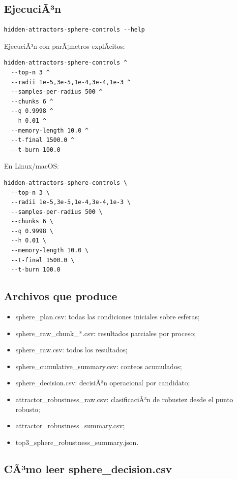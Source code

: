 \documentclass[11pt]{article}
\DeclareRobustCommand{\codepath}[1]{\begingroup\Urlmuskip=0mu plus 2mu\path{#1}\endgroup}
\def\codepath#1{#1}%
\begin{document}
\subsection{EjecuciÃ³n}

\begin{lstlisting}
hidden-attractors-sphere-controls --help
\end{lstlisting}

EjecuciÃ³n con parÃ¡metros explÃ­citos:

\begin{lstlisting}
hidden-attractors-sphere-controls ^
  --top-n 3 ^
  --radii 1e-5,3e-5,1e-4,3e-4,1e-3 ^
  --samples-per-radius 500 ^
  --chunks 6 ^
  --q 0.9998 ^
  --h 0.01 ^
  --memory-length 10.0 ^
  --t-final 1500.0 ^
  --t-burn 100.0
\end{lstlisting}

En Linux/macOS:

\begin{lstlisting}
hidden-attractors-sphere-controls \
  --top-n 3 \
  --radii 1e-5,3e-5,1e-4,3e-4,1e-3 \
  --samples-per-radius 500 \
  --chunks 6 \
  --q 0.9998 \
  --h 0.01 \
  --memory-length 10.0 \
  --t-final 1500.0 \
  --t-burn 100.0
\end{lstlisting}

\subsection{Archivos que produce}

\begin{itemize}
\item \codepath{sphere_plan.csv}: todas las condiciones iniciales sobre esferas;
\item \codepath{sphere_raw_chunk_*.csv}: resultados parciales por proceso;
\item \codepath{sphere_raw.csv}: todos los resultados;
\item \codepath{sphere_cumulative_summary.csv}: conteos acumulados;
\item \codepath{sphere_decision.csv}: decisiÃ³n operacional por candidato;
\item \codepath{attractor_robustness_raw.csv}: clasificaciÃ³n de robustez desde el punto robusto;
\item \codepath{attractor_robustness_summary.csv};
\item \codepath{top3_sphere_robustness_summary.json}.
\end{itemize}

\subsection[CÃ³mo leer sphere\_decision.csv]{CÃ³mo leer \codepath{sphere_decision.csv}}
\end{document}

